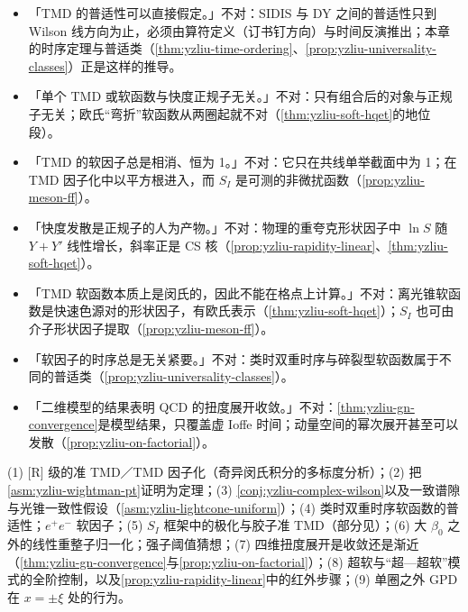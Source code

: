 \begin{tcolorbox}[enhanced,breakable,colback=gray!3!white,colframe=gray!45!black,boxrule=0.5pt,arc=2pt,left=4pt,right=4pt,top=2pt,bottom=2pt,title={常见误解},fonttitle=\bfseries\small]
\small
\begin{itemize}[leftmargin=1.2em,itemsep=1pt,topsep=1pt]
\item 「TMD 的普适性可以直接假定。」不对：SIDIS 与 DY 之间的普适性只到 Wilson 线方向为止，必须由算符定义（订书钉方向）与时间反演推出；本章的时序定理与普适类（\cref{thm:yzliu-time-ordering}、\cref{prop:yzliu-universality-classes}）正是这样的推导。
\item 「单个 TMD 或软函数与快度正规子无关。」不对：只有组合后的对象与正规子无关；欧氏“弯折”软函数从两圈起就不对（\cref{thm:yzliu-soft-hqet}的地位段）。
\item 「TMD 的软因子总是相消、恒为 1。」不对：它只在共线单举截面中为 1；在 TMD 因子化中以平方根进入，而 $S_I$ 是可测的非微扰函数（\cref{prop:yzliu-meson-ff}）。
\item 「快度发散是正规子的人为产物。」不对：物理的重夸克形状因子中 $\ln S$ 随 $Y+Y'$ 线性增长，斜率正是 CS 核（\cref{prop:yzliu-rapidity-linear}、\cref{thm:yzliu-soft-hqet}）。
\item 「TMD 软函数本质上是闵氏的，因此不能在格点上计算。」不对：离光锥软函数是快速色源对的形状因子，有欧氏表示（\cref{thm:yzliu-soft-hqet}）；$S_I$ 也可由介子形状因子提取（\cref{prop:yzliu-meson-ff}）。
\item 「软因子的时序总是无关紧要。」不对：类时双重时序与碎裂型软函数属于不同的普适类（\cref{prop:yzliu-universality-classes}）。
\item 「二维模型的结果表明 QCD 的扭度展开收敛。」不对：\cref{thm:yzliu-gn-convergence}是模型结果，只覆盖虚 Ioffe 时间；动量空间的幂次展开甚至可以发散（\cref{prop:yzliu-on-factorial}）。
\end{itemize}
\end{tcolorbox}

\begin{remark}[开放问题]\label{rem:yzliu-open}
(1) [R] 级的准 TMD／TMD 因子化（奇异闵氏积分的多标度分析）；(2) 把\cref{asm:yzliu-wightman-pt}证明为定理；(3) \cref{conj:yzliu-complex-wilson}以及一致谱隙与光锥一致性假设（\cref{asm:yzliu-lightcone-uniform}）；(4) 类时双重时序软函数的普适性；$e^+e^-$ 软因子；(5) $S_I$ 框架中的极化与胶子准 TMD（部分见\cite{Ebert:2022fmh}）；(6) 大 $\beta_0$ 之外的线性重整子归一化；强子阈值猜想；(7) 四维扭度展开是收敛还是渐近（\cref{thm:yzliu-gn-convergence}与\cref{prop:yzliu-on-factorial}）；(8) 超软与“超—超软”模式的全阶控制，以及\cref{prop:yzliu-rapidity-linear}中的红外步骤；(9) 单圈之外 GPD 在 $x=\pm\xi$ 处的行为。
\end{remark}

